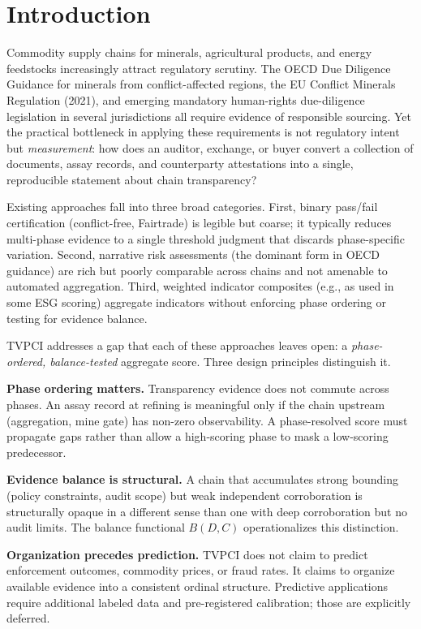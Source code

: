 \documentclass[12pt]{article}
\begin{document}
\section{Introduction}\label{introduction}

Commodity supply chains for minerals, agricultural products, and energy
feedstocks increasingly attract regulatory scrutiny. The OECD Due
Diligence Guidance for minerals from conflict-affected regions, the EU
Conflict Minerals Regulation (2021), and emerging mandatory human-rights
due-diligence legislation in several jurisdictions all require evidence
of responsible sourcing. Yet the practical bottleneck in applying these
requirements is not regulatory intent but \emph{measurement}: how does
an auditor, exchange, or buyer convert a collection of documents, assay
records, and counterparty attestations into a single, reproducible
statement about chain transparency?

Existing approaches fall into three broad categories. First, binary
pass/fail certification (conflict-free, Fairtrade) is legible but
coarse; it typically reduces multi-phase evidence to a single threshold
judgment that discards phase-specific variation. Second, narrative risk
assessments (the dominant form in OECD guidance) are rich but poorly
comparable across chains and not amenable to automated aggregation.
Third, weighted indicator composites (e.g., as used in some ESG scoring)
aggregate indicators without enforcing phase ordering or testing for
evidence balance.

TVPCI addresses a gap that each of these approaches leaves open: a
\emph{phase-ordered, balance-tested} aggregate score. Three design
principles distinguish it.

\textbf{Phase ordering matters.} Transparency evidence does not commute
across phases. An assay record at refining is meaningful only if the
chain upstream (aggregation, mine gate) has non-zero observability. A
phase-resolved score must propagate gaps rather than allow a
high-scoring phase to mask a low-scoring predecessor.

\textbf{Evidence balance is structural.} A chain that accumulates strong
bounding (policy constraints, audit scope) but weak independent
corroboration is structurally opaque in a different sense than one with
deep corroboration but no audit limits. The balance functional
\(B(D,C)\) operationalizes this distinction.

\textbf{Organization precedes prediction.} TVPCI does not claim to
predict enforcement outcomes, commodity prices, or fraud rates. It
claims to organize available evidence into a consistent ordinal
structure. Predictive applications require additional labeled data and
pre-registered calibration; those are explicitly deferred.
\end{document}
